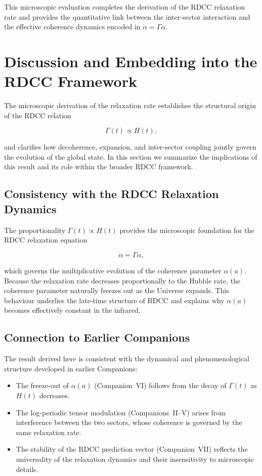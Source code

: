 \documentclass[11pt,a4paper]{article}
\newcommand{\RelaxEq}{\dot{\alpha} = \Gamma \alpha}
\begin{document}
This microscopic evaluation completes the derivation of the RDCC relaxation
rate and provides the quantitative link between the inter-sector interaction and
the effective coherence dynamics encoded in \(\RelaxEq\).

\section{Discussion and Embedding into the RDCC Framework}

The microscopic derivation of the relaxation rate establishes the structural
origin of the RDCC relation


\[
\Gamma(t) \propto H(t),
\]


and clarifies how decoherence, expansion, and inter-sector coupling jointly
govern the evolution of the global state. In this section we summarize the
implications of this result and its role within the broader RDCC framework.

\subsection{Consistency with the RDCC Relaxation Dynamics}

The proportionality \(\Gamma(t) \propto H(t)\) provides the microscopic
foundation for the RDCC relaxation equation


\[
\RelaxEq,
\]


which governs the multiplicative evolution of the coherence parameter
\(\alpha(a)\). Because the relaxation rate decreases proportionally to the
Hubble rate, the coherence parameter naturally freezes out as the Universe
expands. This behaviour underlies the late-time structure of RDCC and explains
why \(\alpha(a)\) becomes effectively constant in the infrared.

\subsection{Connection to Earlier Companions}

The result derived here is consistent with the dynamical and phenomenological
structure developed in earlier Companions:

\begin{itemize}
    \item The freeze-out of \(\alpha(a)\) (Companion~VI) follows from the decay of
          \(\Gamma(t)\) as \(H(t)\) decreases.
    \item The log-periodic tensor modulation (Companions~II--V) arises from
          interference between the two sectors, whose coherence is governed by
          the same relaxation rate.
    \item The stability of the RDCC prediction vector (Companion~VII) reflects
          the universality of the relaxation dynamics and their insensitivity to
          microscopic details.
\end{itemize}
\end{document}
